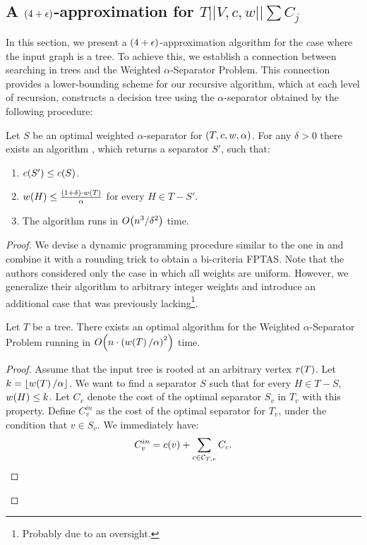 \subsection{A $\mathopen{}\left( 4+\epsilon \right)$-approximation for $T||V,c,w||\sum C_j$}\label{serachingInTs}

In this section, we present a $\mathopen{}\left( 4+\epsilon \right)$-approximation algorithm 
for the case where the input graph is a tree. 
To achieve this, we establish a connection between searching in trees and 
the Weighted $\alpha$-Separator Problem. 
This connection provides a lower-bounding scheme for our recursive algorithm, 
which at each level of recursion, constructs a decision tree using the 
$\alpha$-separator obtained by the following procedure:

\begin{theorem}\label{bicriteriaFPTAS}
    Let $S$ be an optimal weighted $\alpha$-separator for $\mathopen{}\left( T,c,w,\alpha \right)$. For any $\delta>0$ there exists an algorithm \FSeparatorFPTAS, which returns a separator $S'$, such that:
    \begin{enumerate}
        \item $c\mathopen{}\left( S' \right)\leq c\mathopen{}\left( S \right)$.
        \item $w\mathopen{}\left( H \right)\leq \frac{\mathopen{}\left( 1+\delta \right)\cdot w\mathopen{}\left( T \right)}{\alpha}$ for every $H\in T-S'$.
        \item The algorithm runs in $O\mathopen{}\left( n^3/\delta^2 \right)$ time.
    \end{enumerate}
\begin{proof}
We devise a dynamic programming procedure similar to the one in \cite{kseparator} and combine it with a rounding trick to obtain a bi-criteria FPTAS.
Note that the authors considered only the case in which all weights are uniform. However, we generalize their algorithm to arbitrary integer weights and introduce an additional case that 
was previously lacking\footnote{Probably due to an oversight.}.

\begin{theorem}\label{separator}
    Let $T$ be a tree. 
    There exists an optimal algorithm for the Weighted $\alpha$-Separator Problem running in 
    $O\mathopen{}\left( n\cdot \mathopen{}\left( w\mathopen{}\left( T \right)/\alpha \right)^2 \right)$ time.

\begin{proof}
    Assume that the input tree is rooted at an arbitrary vertex $r\mathopen{}\left( T \right)$. Let $k=\mathopen{}\left\lfloor w\mathopen{}\left( T \right)/\alpha \right\rfloor$. We want to find a separator $S$ such that for every $H\in T-S$, $w\mathopen{}\left( H \right)\leq k$.
    Let $C_{v}$ denote the cost of the optimal separator $S_v$ in $T_v$ with this property. 
    Define $C_{v}^{in}$ as the cost of the optimal separator for $T_v$, 
    under the condition that $v \in S_v$. 
    We immediately have:
    $$
    C_{v}^{in} = c\mathopen{}\left( v \right)+\sum_{c\in \mathcal{C}_{T,v}}C_{c}.
    $$
    

\end{proof}
\end{theorem}
\end{proof}
\end{theorem}
